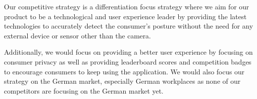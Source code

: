 Our competitive strategy is a differentiation focus strategy where we aim for our product to be a technological and user experience leader by providing the latest technologies to accurately detect the consumer’s posture without the need for any external device or sensor other than the camera. 

Additionally, we would focus on providing a better user experience by focusing on consumer privacy as well as providing leaderboard scores and competition badges to encourage consumers to keep using the application. We would also focus our strategy on the German market, especially German workplaces as none of our competitors are focusing on the German market yet.



